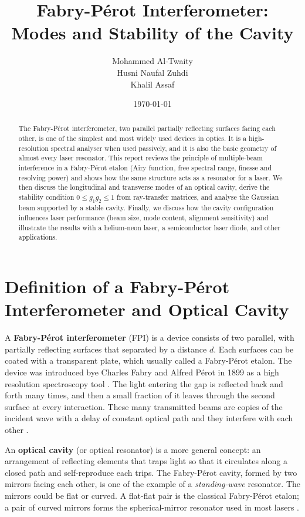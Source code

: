 \documentclass[11pt,a4paper]{article}
\title{\textbf{Fabry-P\'erot Interferometer:\\ Modes and Stability of the Cavity}}
\author{
	Mohammed Al-Twaity\\
	Husni Naufal Zuhdi\\
	Khalil Assaf
}
\date{\today}
\newcommand{\FP}{Fabry-P\'erot}
\begin{document}
	
	\maketitle
	
	\begin{abstract}
		\noindent
		The \FP{} interferometer, two parallel partially reflecting surfaces facing each other, is one of the simplest and most widely used devices in optics. It is a high-resolution spectral analyser when used passively, and it is also the basic geometry of almost every laser resonator. This report reviews the principle of multiple-beam interference in a \FP{} etalon (Airy function, free spectral range, finesse and resolving power) and shows how the same structure acts as a resonator for a laser. We then discuss the longitudinal and transverse modes of an optical cavity, derive the stability condition $0\le g_1g_2\le 1$ from ray-transfer matrices, and analyse the Gaussian beam supported by a stable cavity. Finally, we discuss how the cavity configuration influences laser performance (beam size, mode content, alignment sensitivity) and illustrate the results with a helium-neon laser, a semiconductor laser diode, and other applications.
	\end{abstract}
	
	
	\section{Definition of a \FP{} Interferometer and Optical Cavity}
	
	A \textbf{\FP{} interferometer} (FPI) is a device consists of two parallel, with partially reflecting surfaces that separated by a distance $d$. Each surfaces can be coated with a transparent plate, which usually called a \FP{} etalon. The device was introduced bye Charles Fabry and Alfred P\'erot in 1899 as a high resolution spectroscopy tool \cite{FabryPerot1899}. The light entering the gap is reflected back and forth many times, and then a small fraction of it leaves through the second surface at every interaction. These many transmitted beams are copies of the incident wave with a delay of constant optical path and they interfere with each other \cite{BornWolf, Hecht, Vaughan}.
	
	An \textbf{optical cavity} (or optical resonator) is a more general concept: an arrangement of reflecting elements that traps light so that it circulates along a closed path and self-reproduce each trips. The \FP{} cavity, formed by two mirrors facing each other, is one of the example of a \emph{standing-wave} resonator. The mirrors could be flat or curved. A flat-flat pair is the classical \FP{} etalon; a pair of curved mirrors forms the spherical-mirror resonator used in most lasers \cite{Siegman,Svelto,SalehTeich}.
	
\end{document}
